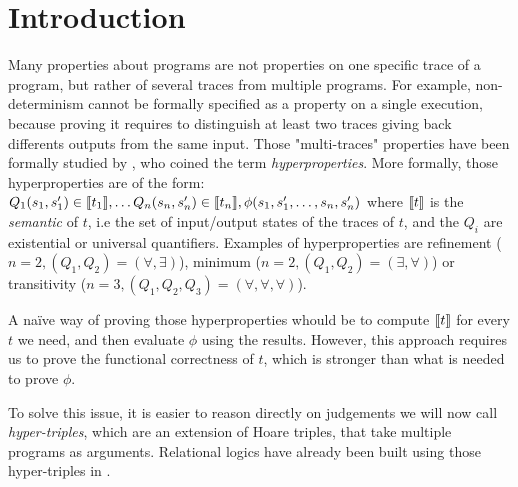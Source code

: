 \section{Introduction}

Many properties about programs are not properties on one specific trace of a program, but rather of several traces from multiple programs. For example, non-determinism cannot be formally specified as a property on a single execution, because proving it requires to distinguish at least two traces giving back differents outputs from the same input. Those "multi-traces" properties have been formally studied by \citet{ClarksonS08}, who coined the term \emph{hyperproperties}.
More formally, those hyperproperties are of the form:
\(
    Q_1 (s_1, s'_1) \in \sem{t_1},
    \dots
    Q_n (s_n, s'_n) \in \sem{t_n},
    \phi(s_1, s'_1, \dots, s_n, s'_n)
\)
where $\llbracket t\rrbracket$ is the \emph{semantic} of $t$, i.e the set of input/output states of the traces of $t$, and the $Q_i$ are existential or universal quantifiers. Examples of hyperproperties are refinement ($n = 2, (Q_1, Q_2) = (\forall, \exists)$), minimum ($n = 2, (Q_1, Q_2) = (\exists, \forall)$) or transitivity ($n = 3, (Q_1, Q_2, Q_3) = (\forall, \forall, \forall)$).

A naïve way of proving those hyperproperties whould be to compute $\llbracket t\rrbracket$ for every $t$ we need, and then evaluate $\phi$ using the results. However, this approach requires us to prove the functional correctness of $t$, which is stronger than what is needed to prove $\phi$.

To solve this issue, it is easier to reason directly on judgements we will now call \emph{hyper-triples}, which are an extension of Hoare triples, that take multiple programs as arguments. Relational logics have already been built using those hyper-triples in \cite{Yang07, SousaD16, Benton04, BartheCK16}. 